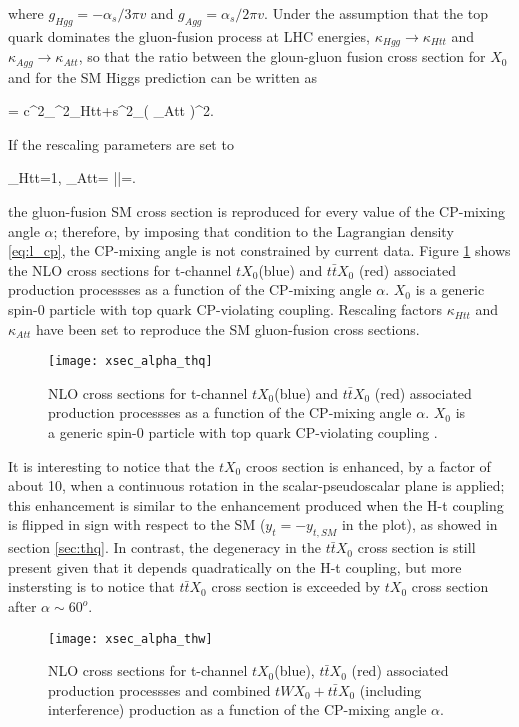 \noindent where $g_{Hgg}=-\alpha_s/3\pi v$ and $g_{Agg}= \alpha_s/2\pi v$.  Under the assumption that the top quark dominates the gluon-fusion process at LHC energies, $\kappa_{Hgg} \to \kappa_{Htt}$ and  $\kappa_{Agg} \to \kappa_{Att}$, so that the ratio between the gloun-gluon fusion cross section for $X_0$ and for the SM Higgs prediction can be written as     

\beqn
{}=  c^2_\alpha\kappa^2_{Htt}+s^2_\alpha \left( \kappa_{Att} \right)^2.
\label{eq:GFrate}
\eeqn

\noindent If the rescaling parameters are set to

\beqn
\kappa_{Htt}=1, \qquad \kappa_{Att}= \left|\right|=.
\label{eq:GFrate}
\eeqn

\noindent the gluon-fusion SM cross section is reproduced for every value of the CP-mixing angle $\alpha$; therefore, by imposing that condition to the Lagrangian density \ref{eq:l_cp}, the CP-mixing angle is not constrained by current data. Figure \ref{xsec_alpha_thq} shows the NLO cross sections for t-channel $tX_0$(blue) and $t\bar{t}X_0$ (red) associated production processses as a function of the CP-mixing angle $\alpha$. $X_0$ is a generic spin-0 particle with top quark CP-violating coupling. Rescaling factors $\kappa_{Htt}$ and  $\kappa_{Att}$ have been set to reproduce the SM gluon-fusion cross sections.   

\begin{figure}[h!]
\centering
\texttt{[image: xsec\_alpha\_thq]}
\caption[NLO cross section for $tX_0$ and $t\bar{t}X_0$.]{NLO cross sections for t-channel $tX_0$(blue) and $t\bar{t}X_0$ (red) associated production processses as a function of the CP-mixing angle $\alpha$. $X_0$ is a generic spin-0 particle with top quark CP-violating coupling \cite{maltoni2}.} 
\label{xsec_alpha_thq}
\end{figure}

\noindent It is interesting to notice that the $tX_0$ croos section is enhanced, by a factor of about 10, when a continuous rotation in the scalar-pseudoscalar plane is applied; this enhancement is similar to the enhancement produced when the H-t coupling is flipped in sign with respect to the SM ($y_t=-y_{t,SM}$ in the plot), as showed in section \ref{sec:thq}. In contrast, the degeneracy in the $t\bar{t}X_0$ cross section is still present given that it depends quadratically on the H-t coupling, but more instersting is to notice that $t\bar{t}X_0$ cross section is exceeded by $tX_0$ cross section after $\alpha\sim 60^o$.
\begin{figure}[h!]
\centering
\texttt{[image: xsec\_alpha\_thw]}
\caption[NLO cross section for $tWX_0$, $t\bar{t}X_0$.]{NLO cross sections for t-channel $tX_0$(blue), $t\bar{t}X_0$ (red) associated production processses and combined $tWX_0 + t\bar{t}X_0$ (including interference) production as a function of the CP-mixing angle $\alpha$\cite{maltoni2}.} 
\label{xsec_alpha_thw}
\end{figure}

